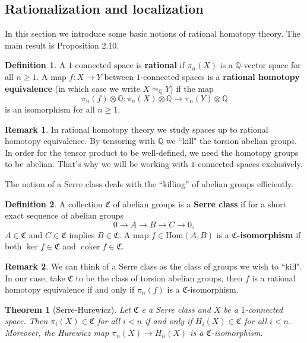 \documentclass[psamsfonts]{amsart}
\newtheorem{thm}{Theorem}[section]
\theoremstyle{definition}
\newtheorem{defn}{Definition}[section]
\newtheorem{rem}{Remark}[section]
\newcommand{\Q}{\mathbb{Q}}
\newcommand{\Hom}{\mathrm{Hom}}
\DeclareMathOperator{\coker}{coker}
\numberwithin{equation}{section}
\begin{document}
\subsection{Rationalization and localization}

In this section we introduce some basic notions of rational homotopy theory. The main result is Proposition 2.10.

\begin{defn}
A $1$-connected space is \textbf{rational} if $\pi_n(X)$ is a $\Q$-vector space for all $n\geq1$. A map $f:X\to Y$ between $1$-connected spaces is a \textbf{rational homotopy equivalence} (in which case we write $X\simeq_\Q Y$) if the map
\[\pi_n(f)\otimes\Q:\pi_n(X)\otimes\Q\to\pi_n(Y)\otimes\Q\]
is an isomorphism for all $n\geq1$.
\end{defn}

\begin{rem}
In rational homotopy theory we study spaces up to rational homotopy equivalence. By tensoring with $\Q$ we ``kill" the torsion abelian groups. In order for the tensor product to be well-defined, we need the homotopy groups to be abelian. That's why we will be working with $1$-connected spaces exclusively. 
\end{rem}

The notion of a Serre class deals with the ``killing'' of abelian groups efficiently.

\begin{defn}
A collection $\mathfrak{C}$ of abelian groups is a \textbf{Serre class} if for a short exact sequence of abelian groups
\[0\rightarrow A\to B\to C\to0,\]
$A\in\mathfrak{C}$ and $C\in\mathfrak{C}$ implies $B\in\mathfrak{C}$. A map $f\in\Hom(A,B)$ is a \textbf{$\mathfrak{C}$-isomorphism} if both $\ker f\in\mathfrak{C}$ and $\coker f\in\mathfrak{C}$.
\end{defn}

\begin{rem}
We can think of a Serre class as the class of groups we wish to ``kill". In our case, take $\mathfrak{C}$ to be the class of torsion abelian groups, then $f$ is a rational homotopy equivalence if and only if $\pi_n(f)$ is a $\mathfrak{C}$-isomorphism.
\end{rem}

\begin{thm}[Serre-Hurewicz]
Let $\mathfrak{C}$ e a Serre class and $X$ be a $1$-connected space. Then $\pi_i(X)\in\mathfrak{C}$ for all $i<n$ if and only if $H_i(X)\in\mathfrak{C}$ for all $i<n$. Moreover, the Hurewicz map $\pi_n(X)\to H_n(X)$ is a $\mathfrak{C}$-isomorphism.
\end{thm}
\end{document}
